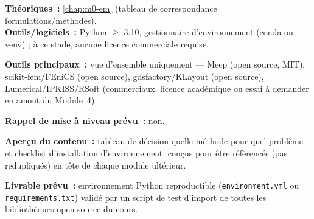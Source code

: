 \begin{prerequis}
\textbf{Théoriques~:} \cref{chap:m0-em} (tableau de correspondance formulations/méthodes).\\
\textbf{Outils/logiciels~:} Python $\geq$ 3.10, gestionnaire d'environnement (conda ou venv) ; à ce stade, aucune licence commerciale requise.
\end{prerequis}

\noindent\textbf{Outils principaux~:} vue d'ensemble uniquement — Meep (open source, MIT), scikit-fem/FEniCS (open source), gdsfactory/KLayout (open source), Lumerical/IPKISS/RSoft (commerciaux, licence académique ou essai à demander en amont du Module~4).

\noindent\textbf{Rappel de mise à niveau prévu~:} non.

\noindent\textbf{Aperçu du contenu~:} tableau de décision \og quelle méthode pour quel problème\fg{} et checklist d'installation d'environnement, conçus pour être référencés (pas redupliqués) en tête de chaque module ultérieur.

\noindent\textbf{Livrable prévu~:} environnement Python reproductible (\texttt{environment.yml} ou \texttt{requirements.txt}) validé par un script de test d'import de toutes les bibliothèques open source du cours.
